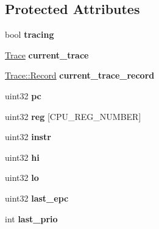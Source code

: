 \subsection*{Protected Attributes}
\begin{DoxyCompactItemize}
\item 
\hypertarget{classCPU_a30e8bf76edeea76f1f19a3bf7588f08a}{
bool {\bfseries tracing}}
\label{classCPU_a30e8bf76edeea76f1f19a3bf7588f08a}

\item 
\hypertarget{classCPU_acf034d26af3bd99a779aa8cb03e4670b}{
\hyperlink{classTrace}{Trace} {\bfseries current\_\-trace}}
\label{classCPU_acf034d26af3bd99a779aa8cb03e4670b}

\item 
\hypertarget{classCPU_a07aec7e8072099db8530d76af2335014}{
\hyperlink{structTrace_1_1Record}{Trace::Record} {\bfseries current\_\-trace\_\-record}}
\label{classCPU_a07aec7e8072099db8530d76af2335014}

\item 
\hypertarget{classCPU_a814367f222141355ec6deb579b6f0c58}{
uint32 {\bfseries pc}}
\label{classCPU_a814367f222141355ec6deb579b6f0c58}

\item 
\hypertarget{classCPU_a2a203ccf5813098e0dbedff0e47a76d3}{
uint32 {\bfseries reg} \mbox{[}CPU\_\-REG\_\-NUMBER\mbox{]}}
\label{classCPU_a2a203ccf5813098e0dbedff0e47a76d3}

\item 
\hypertarget{classCPU_ad754b47111e41660a7707bf0002bfa76}{
uint32 {\bfseries instr}}
\label{classCPU_ad754b47111e41660a7707bf0002bfa76}

\item 
\hypertarget{classCPU_af3f7d0decfadf0044fca99c868108055}{
uint32 {\bfseries hi}}
\label{classCPU_af3f7d0decfadf0044fca99c868108055}

\item 
\hypertarget{classCPU_a0ae013325ebf52209475496f1e45264d}{
uint32 {\bfseries lo}}
\label{classCPU_a0ae013325ebf52209475496f1e45264d}

\item 
\hypertarget{classCPU_a9474f06e26d535fb212ca3b594729214}{
uint32 {\bfseries last\_\-epc}}
\label{classCPU_a9474f06e26d535fb212ca3b594729214}

\item 
\hypertarget{classCPU_a5e994b9bd7c9e4cdd9f96c05b8628508}{
int {\bfseries last\_\-prio}}
\label{classCPU_a5e994b9bd7c9e4cdd9f96c05b8628508}


\end{DoxyCompactItemize}
